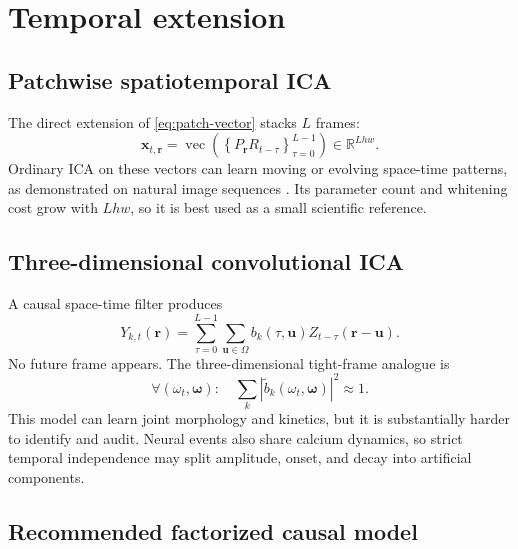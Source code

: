 \documentclass[11pt]{article}
\newcommand{\R}{\mathbb{R}}
\begin{document}
\section{Temporal extension}

\subsection{Patchwise spatiotemporal ICA}

The direct extension of \cref{eq:patch-vector} stacks $L$ frames:
\begin{equation}
\bm x_{t,\bm r}
=
\operatorname{vec}
\left(
\left\{
P_{\bm r}R_{t-\tau}
\right\}_{\tau=0}^{L-1}
\right)
\in\R^{Lhw}.
\label{eq:st-patch}
\end{equation}
Ordinary ICA on these vectors can learn moving or evolving space-time patterns,
as demonstrated on natural image sequences
\cite{vanhateren1998stica}. Its parameter count and whitening cost grow with
$Lhw$, so it is best used as a small scientific reference.

\subsection{Three-dimensional convolutional ICA}

A causal space-time filter produces
\begin{equation}
Y_{k,t}(\bm r)
=
\sum_{\tau=0}^{L-1}
\sum_{\bm u\in\Omega}
b_k(\tau,\bm u)
Z_{t-\tau}(\bm r-\bm u).
\label{eq:3d-cica}
\end{equation}
No future frame appears. The three-dimensional tight-frame analogue is
\begin{equation}
\forall(\omega_t,\bm\omega):
\quad
\sum_k
|\widetilde b_k(\omega_t,\bm\omega)|^2
\approx1.
\end{equation}
This model can learn joint morphology and kinetics, but it is substantially
harder to identify and audit. Neural events also share calcium dynamics, so
strict temporal independence may split amplitude, onset, and decay into
artificial components.

\subsection{Recommended factorized causal model}
\end{document}
